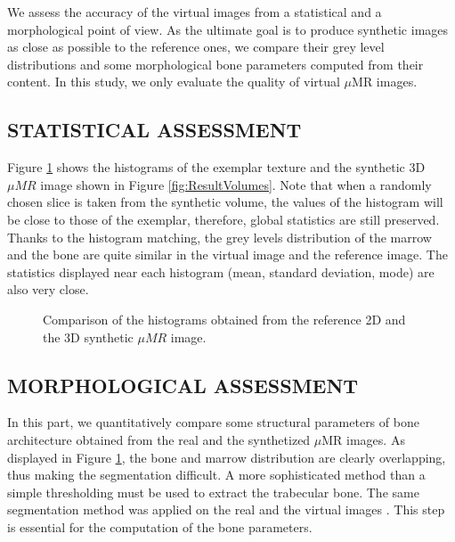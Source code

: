 \documentclass[10pt, conference]{IEEEtran}
\begin{document}
{We assess the accuracy of the virtual images from a statistical and a morphological point of view. As the ultimate goal is to produce synthetic images as close as possible 
to the reference ones, we compare their grey level distributions and some morphological bone parameters computed from their content. 
In this study, we only evaluate the quality of virtual $\mu$MR images.%


\subsection{\uppercase{Statistical assessment }}
\label{sec:Statistics}
%
Figure \ref{fig:histograms} shows the histograms of the exemplar texture and the synthetic 3D $\mu{MR}$ 
image shown in Figure \ref{fig:ResultVolumes}. 
Note that when a randomly chosen slice is taken from the synthetic volume, the values of the histogram will be close to those of the exemplar,
therefore, global statistics are still preserved. 
Thanks to the histogram matching, 
the grey levels distribution of the marrow and the bone are quite similar in the virtual image and the reference image. 
The statistics displayed near each histogram (mean, standard deviation, mode) are also very close.
%
\begin{figure}
 \centering 
\caption{Comparison of the histograms obtained from the reference 2D and the 3D synthetic $\mu{MR}$ image.}
 \label{fig:histograms}
\end{figure}

\subsection{\uppercase{Morphological assessment}}
\label{sec:Morphology}
\noindent
In this part, we quantitatively compare some structural parameters of bone architecture obtained from the real and the synthetized $\mu$MR images.
As displayed in Figure \ref{fig:histograms}, the bone and marrow distribution are clearly overlapping, thus making the segmentation difficult. A more sophisticated method than a simple thresholding must be used to extract the trabecular bone. The same segmentation method was applied on the real and the virtual images \cite{PR2002}. This step is essential for the computation of the bone parameters.  %

}
\end{document}
